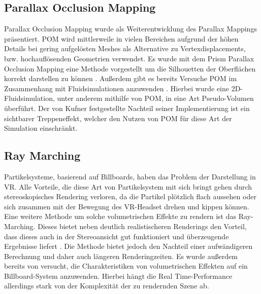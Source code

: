 \subsection{Parallax Occlusion Mapping}
Parallax Occlusion Mapping \parencite{Brawley2004} wurde als Weiterentwicklung des Parallax Mappings \parencite{Kaneko2001} präsentiert.
POM wird mittlerweile in vielen Bereichen aufgrund der höhen Details bei gering aufgelösten Meshes \parencite{Tatarchuk2006} als 
Alternative zu Vertexdisplacements, bzw. hochauflösenden Geometrien verwendet. Es wurde mit dem Prism Parallax Occlusion Mapping
eine Methode vorgestellt um die Silhouetten der Oberflächen korrekt darstellen zu können \parencite{Dachsbacher2007}. 
Außerdem gibt es bereits Versuche POM im Zusammenhang mit Fluidsimulationen 
anzuwenden \parencite{Kufner2017}. Hierbei wurde eine 2D-Fluidsimulation, unter anderem mithilfe von POM, in eine Art Pseudo-Volumen überführt. 
Der von Kufner festgestellte Nachteil seiner Implementierung ist ein sichtbarer Treppeneffekt, welcher den Nutzen von POM für diese 
Art der Simulation einschränkt. 



\subsection{Ray Marching}
Partikelsysteme, basierend auf Billboards, haben das Problem der Darstellung in VR. Alle Vorteile, die diese Art von 
Partikelsystem mit sich bringt gehen durch stereoskopisches Rendering verloren, da die Partikel plötzlich flach aussehen 
oder sich zusammen mit der Bewegung des VR-Headset drehen und kippen können. Eine weitere Methode um solche volumetrischen 
Effekte zu rendern ist das Ray-Marching. Dieses bietet neben deutlich realistischeren Renderings den Vorteil, dass dieses 
auch in der Stereoansicht gut funktioniert und überzeugende Ergebnisse liefert \parencite{Wald2006}. Die Methode bietet 
jedoch den Nachteil einer aufwändigeren Berechnung und daher auch längeren Renderingzeiten. Es wurde außerdem bereits von 
\textcite{Zhang2020} versucht, die Charakteristiken von volumetrischen Effekten auf ein Billboard-System anzuwenden. 
Hierbei hängt die Real Time-Performance allerdings stark von der Komplexität der zu rendernden Szene ab.